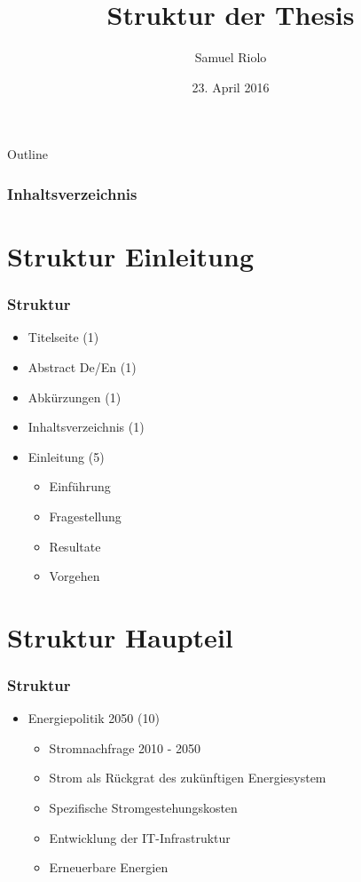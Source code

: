 \documentclass{beamer}
\title[Energie in der Informatik]{Struktur der Thesis}
\author{Samuel Riolo}
\institute{FFHS}
\date{23. April 2016}
\begin{document}
\begin{frame}
  \titlepage
\end{frame}

\begin{frame}{Outline}
\frametitle{Inhaltsverzeichnis}
    \tableofcontents[]
\end{frame}

\section{Struktur Einleitung} 
\begin{frame}
\frametitle{Struktur} 
\begin{itemize}
\item Titelseite                                      (1)
\item Abstract De/En                                  (1)
\item Abkürzungen                                     (1)
\item Inhaltsverzeichnis                              (1)

\item Einleitung                                      (5)
 \begin{itemize}
 \item Einführung
 \item Fragestellung
 \item Resultate
 \item Vorgehen     
 \end{itemize}
\end{itemize}

\end{frame}


\section{Struktur Haupteil}
\begin{frame}
\frametitle{Struktur} 
\begin{itemize}
\item Energiepolitik 2050                             (10)
\begin{itemize}
 \item Stromnachfrage 2010 - 2050
 \item Strom als Rückgrat des zukünftigen Energiesystem
 \item Spezifische Stromgestehungskosten
 \item Entwicklung der IT-Infrastruktur
 \item Erneuerbare Energien
\end{itemize}
\end{itemize}

\end{frame}
\end{document}
